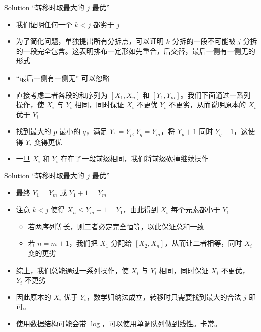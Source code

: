 ﻿\documentclass[aspectratio=169,handout]{ctexbeamer}
\begin{document}
\begin{frame}{Solution}
    “转移时取最大的 $j$ 最优”
    \pause
    \begin{itemize}
        \item 我们证明任何一个 $k<j$ 都劣于 $j$
        \pause
        \item 为了简化问题，单独提出所有分拆点，可以证明 $k$ 分拆的一段不可能被 $j$ 分拆的一段完全包含。这表明排布一定形如先重合，后交替，最后一侧有一侧无的形式
        \item “最后一侧有一侧无” 可以忽略
        \pause
        \item 直接考虑二者各段的和序列为 $[X_1,X_n]$ 和 $[Y_1,Y_m]$。我们下面通过一系列操作，使 $X_i$ 与 $Y_i$ 相同，同时保证 $X_i$ 不更优 $Y_i$ 不更劣，从而说明原本的 $X_i$ 优于 $Y_i$
        \pause
        \item 找到最大的 $p$ 最小的 $q$，满足 $Y_1=Y_p,Y_q=Y_m$，将 $Y_p+1$ 同时 $Y_q-1$，这使得 $Y_i$ 变得更优
        \item 一旦 $X_i$ 和 $Y_i$ 存在了一段前缀相同，我们将前缀砍掉继续操作
    \end{itemize}
\end{frame}

\begin{frame}{Solution}
    “转移时取最大的 $j$ 最优”
    \begin{itemize}
        \item 最终 $Y_1=Y_m$ 或 $Y_1+1=Y_m$
        \pause
        \item 注意 $k<j$ 使得 $X_n\le Y_m-1 = Y_1$，由此得到 $X_i$ 每个元素都小于 $Y_1$
        \pause
        \begin{itemize}
            \item 若两序列等长，则二者必定完全恒等，以此保证总和一致
            \pause
            \item 若 $n=m+1$，我们把 $X_1$ 分配给 $[X_2,X_n]$，从而让二者相等，同时 $X_i$ 变的更劣
            \pause
        \end{itemize}
        \item 综上，我们总能通过一系列操作，使 $X_i$ 与 $Y_i$ 相同，同时保证 $X_i$ 不更优， $Y_i$ 不更劣
        \pause
        \item 因此原本的 $X_i$ 优于 $Y_i$，数学归纳法成立，转移时只需要找到最大的合法 $j$ 即可。
        \pause
        \item 使用数据结构可能会带 $\log$，可以使用单调队列做到线性。卡常。
    \end{itemize}
\end{frame}
\end{document}
